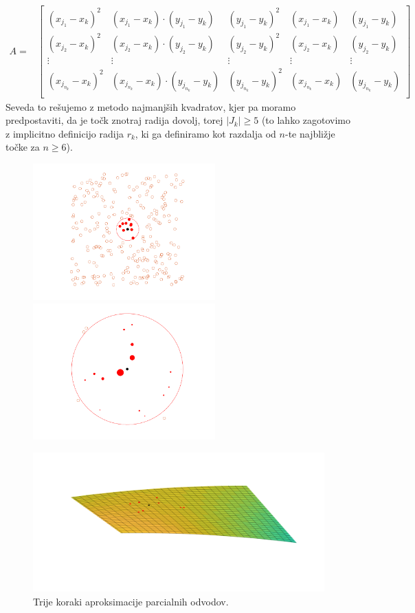 \documentclass[ letterpaper, titlepage, fleqn]{article}
\begin{document}
{\begin{enumerate}
\begin{equation*}
\begin{aligned}
A =&
\begin{bmatrix}
(x_{j_1}- x_k)^2 &  (x_{j_1} - x_k) \cdot (y_{j_1} - y_k) & (y_{j_1} - y_k)^2 & (x_{j_1} - x_k) & (y_{j_1} - y_k) \\
(x_{j_2} - x_k)^2 & (x_{j_2} - x_k) \cdot (y_{j_2} - y_k) & (y_{j_2} - y_k)^2 & (x_{j_2} - x_k) & (y_{j_2} - y_k) \\
\vdots & \vdots & \vdots & \vdots & \vdots \\
(x_{j_{n_k}} - x_k)^2 & (x_{j_{n_k}} - x_k) \cdot (y_{j_{n_k}} - y_k) & (y_{j_{n_k}} - y_k)^2 & (x_{j_{n_k}} - x_k) & (y_{j_{n_k}} - y_k) \\
\end{bmatrix}
\end{aligned}
\end{equation*} 
Seveda to rešujemo z metodo najmanjših kvadratov, kjer pa moramo predpostaviti,
da je točk znotraj radija dovolj, torej $|J_k| \geq 5$ (to lahko zagotovimo z implicitno
definicijo radija $r_k$, ki ga definiramo kot razdalja od $n$-te najbližje točke za $n\geq 6$).
\end{enumerate}

\begin{figure}[h]
\begin{center}
\includegraphics[width=7cm]{slike/derivativeest1.png}
\includegraphics[width=7cm]{slike/derivativeest2.png} 
\end{center} 
\includegraphics[width=\textwidth]{slike/derivativeest4.png}
\caption{ Trije koraki aproksimacije parcialnih odvodov.}
\end{figure}

}
\end{document}
